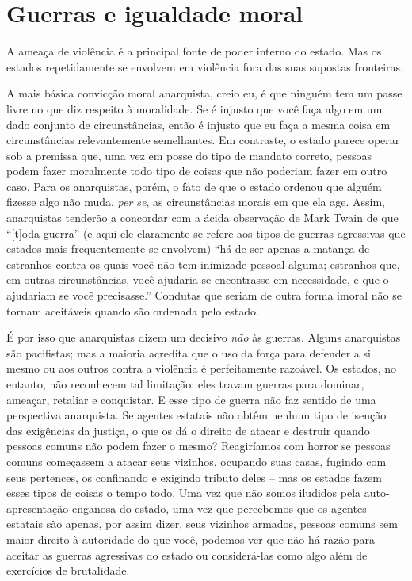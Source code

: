 \section{Guerras e igualdade moral}

A ameaça de violência é a principal fonte de poder interno do estado. Mas os estados repetidamente se envolvem em violência fora das suas supostas fronteiras.

A mais básica convicção moral anarquista, creio eu, é que ninguém tem um passe livre no que diz respeito à moralidade. Se é injusto que você faça algo em um dado conjunto de circunstâncias, então é injusto que eu faça a mesma coisa em circunstâncias relevantemente semelhantes. Em contraste, o estado parece operar sob a premissa que, uma vez em posse do tipo de mandato correto, pessoas podem fazer moralmente todo tipo de coisas que não poderiam fazer em outro caso. Para os anarquistas, porém, o fato de que o estado ordenou que alguém fizesse algo não muda, \emph{per se}, as circunstâncias morais em que ela age. Assim, anarquistas tenderão a concordar com a ácida observação de Mark Twain de que ``[t]oda guerra'' (e aqui ele claramente se refere aos tipos de guerras agressivas que estados mais frequentemente se envolvem) ``há de ser apenas a matança de estranhos contra os quais você não tem inimizade pessoal alguma; estranhos que, em outras circunstâncias, você ajudaria se encontrasse em necessidade, e que o ajudariam se você precisasse.'' Condutas que seriam de outra forma imoral não se tornam aceitáveis quando são ordenada pelo estado.

É por isso que anarquistas dizem um decisivo \emph{não} às guerras. Alguns anarquistas são pacifistas; mas a maioria acredita que o uso da força para defender a si mesmo ou aos outros contra a violência é perfeitamente razoável. Os estados, no entanto, não reconhecem tal limitação: eles travam guerras para dominar, ameaçar, retaliar e conquistar. E esse tipo de guerra não faz sentido de uma perspectiva anarquista. Se agentes estatais não obtêm nenhum tipo de isenção das exigências da justiça, o que os dá o direito de atacar e destruir quando pessoas comuns não podem fazer o mesmo? Reagiríamos com horror se pessoas comuns começassem a atacar seus vizinhos, ocupando suas casas, fugindo com seus pertences, os confinando e exigindo tributo deles -- mas os estados fazem esses tipos de coisas o tempo todo. Uma vez que não somos iludidos pela auto-apresentação enganosa do estado, uma vez que percebemos que os agentes estatais são apenas, por assim dizer, seus vizinhos armados, pessoas comuns sem maior direito à autoridade do que você, podemos ver que não há razão para aceitar as guerras agressivas do estado ou considerá-las como algo além de exercícios de brutalidade.

